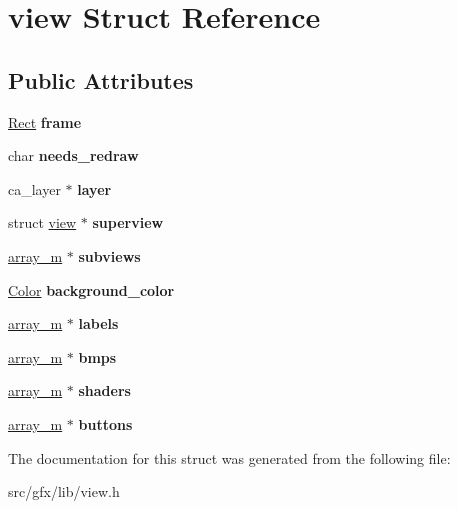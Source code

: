 \hypertarget{structview}{}\section{view Struct Reference}
\label{structview}
\subsection*{Public Attributes}
\begin{DoxyCompactItemize}
\item 
\mbox{\label{structview_ab0e11bc9544d055f2f5e4ba484c914a4}} 
\hyperlink{structrect}{Rect} {\bfseries frame}
\item 
\mbox{\label{structview_a29a91fcb6afe60db3c03735433040b63}} 
char {\bfseries needs\+\_\+redraw}
\item 
\mbox{\label{structview_acc2b11dcf79f223e9b12928bdae7c33b}} 
ca\+\_\+layer $\ast$ {\bfseries layer}
\item 
\mbox{\label{structview_ada1c275d94d596d92ec1e00d5364ec49}} 
struct \hyperlink{structview}{view} $\ast$ {\bfseries superview}
\item 
\mbox{\label{structview_abe4c0c95d1e206dd5f5de68e2e860e01}} 
\hyperlink{structarray__m}{array\+\_\+m} $\ast$ {\bfseries subviews}
\item 
\mbox{\label{structview_a4fe0d8280d1f6e27e1641094ded46bf7}} 
\hyperlink{structcolor}{Color} {\bfseries background\+\_\+color}
\item 
\mbox{\label{structview_a554e0dca03829d8aef4df5a7bfc00e5d}} 
\hyperlink{structarray__m}{array\+\_\+m} $\ast$ {\bfseries labels}
\item 
\mbox{\label{structview_abccba1336ae280d908fe770b5a1c656f}} 
\hyperlink{structarray__m}{array\+\_\+m} $\ast$ {\bfseries bmps}
\item 
\mbox{\label{structview_a849bf028be4d1534a4390368158029e1}} 
\hyperlink{structarray__m}{array\+\_\+m} $\ast$ {\bfseries shaders}
\item 
\mbox{\label{structview_a57de0167fbf55ead9afda9c55c2fa19f}} 
\hyperlink{structarray__m}{array\+\_\+m} $\ast$ {\bfseries buttons}
\end{DoxyCompactItemize}


The documentation for this struct was generated from the following file\+:\begin{DoxyCompactItemize}
\item 
src/gfx/lib/view.\+h\end{DoxyCompactItemize}
